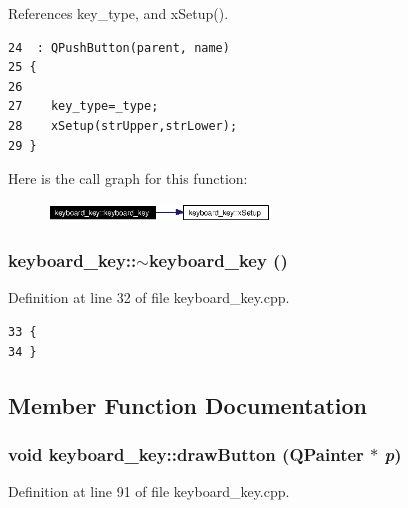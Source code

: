 References key\_\-type, and x\-Setup().



\footnotesize\begin{verbatim}24  : QPushButton(parent, name)
25 {
26    
27    key_type=_type;
28    xSetup(strUpper,strLower);
29 }
\end{verbatim}\normalsize 


Here is the call graph for this function:\begin{figure}[H]
\begin{center}
\leavevmode
\includegraphics[width=167pt]{classkeyboard__key_keyboard__keya0_cgraph}
\end{center}
\end{figure}
\subsubsection{\setlength{\rightskip}{0pt plus 5cm}keyboard\_\-key::$\sim${\bf keyboard\_\-key} ()}\label{classkeyboard__key_keyboard__keya1}




Definition at line 32 of file keyboard\_\-key.cpp.



\footnotesize\begin{verbatim}33 {
34 }
\end{verbatim}\normalsize 


\subsection{Member Function Documentation}
\subsubsection{\setlength{\rightskip}{0pt plus 5cm}void keyboard\_\-key::draw\-Button (QPainter $\ast$ {\em p})\hspace{0.3cm}{\tt  [protected]}}\label{classkeyboard__key_keyboard__keyb0}




Definition at line 91 of file keyboard\_\-key.cpp.

